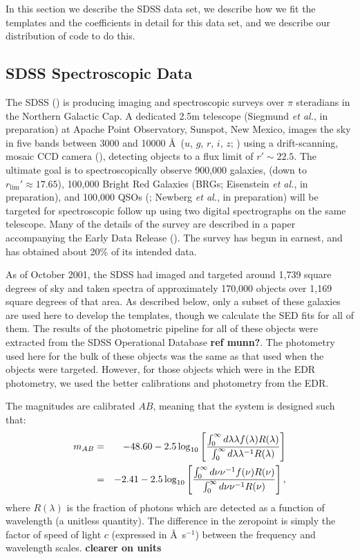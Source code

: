 \documentclass[10pt,preprint]{aastex}
\begin{document}
In this section we describe the SDSS data set, we describe how we fit
the templates and the coefficients in detail for this data set, and we
describe our distribution of code to do this.

\subsection{SDSS Spectroscopic Data}

The SDSS (\citealt{york00a}) is producing imaging and spectroscopic
surveys over $\pi$ steradians in the Northern Galactic Cap. A
dedicated 2.5m telescope (Siegmund {\it et al.}, in preparation) at
Apache Point Observatory, Sunspot, New Mexico, images the sky in five
bands between 3000 and 10000 \AA\ ($u$, $g$, $r$, $i$, $z$;
\citealt{fukugita96a}) using a drift-scanning, mosaic CCD camera
(\citealt{gunn98a}), detecting objects to a flux limit of $r'\sim
22.5$. The ultimate goal is to spectroscopically observe 900,000
galaxies, (down to $r_{\mathrm{lim}}'\approx 17.65$), 100,000 Bright
Red Galaxies (BRGs; Eisenstein {\it et al.}, in preparation), and
100,000 QSOs (\citealt{fan99a}; Newberg {\it et al.}, in preparation)
will be targeted for spectroscopic follow up using two digital
spectrographs on the same telescope. Many of the details of the survey
are described in a paper accompanying the Early Data Release
(\citealt{stoughton01a}). The survey has begun in earnest, and has
obtained about 20\% of its intended data.

As of October 2001, the SDSS had imaged and targeted around 1,739
square degrees of sky and taken spectra of approximately 170,000
objects over 1,169 square degrees of that area. As described below,
only a subset of these galaxies are used here to develop the
templates, though we calculate the SED fits for all of them. The
results of the photometric pipeline for all of these objects were
extracted from the SDSS Operational Database {\bf ref munn?}. The
photometry used here for the bulk of these objects was the same as
that used when the objects were targeted.  However, for those objects
which were in the EDR photometry, we used the better calibrations and
photometry from the EDR.

The magnitudes are calibrated $AB$, meaning that the system is
designed such that:
\begin{eqnarray}
m_{AB} &=& -48.60 - 2.5 \log_{10}\left[
\frac{\int_{0}^{\infty} d\lambda \lambda f(\lambda) R(\lambda)}
{\int_{0}^{\infty} d\lambda \lambda^{-1} R(\lambda)}\right]
\cr
&=& -2.41 - 2.5 \log_{10}\left[
\frac{\int_{0}^{\infty} d\nu \nu^{-1} f(\nu) R(\nu)}
{\int_{0}^{\infty} d\nu \nu^{-1} R(\nu)}\right],
\cr
\end{eqnarray}
where $R(\lambda)$ is the fraction of photons which are detected as a
function of wavelength (a unitless quantity). The difference in the
zeropoint is simply the factor of speed of light $c$ (expressed in
\AA\ s$^{-1}$) between the frequency and wavelength scales. {\bf
clearer on units}
\end{document}
